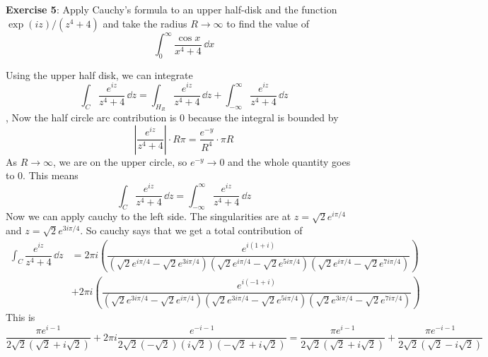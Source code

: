 \documentclass{article}
\begin{document}
\newpage

\textbf{Exercise 5}: Apply Cauchy's formula to an upper half-disk and the function $\exp(iz)/(z^{4} + 4)$ and take the radius $R \rightarrow \infty$ to find the value of 
    \begin{equation*}
        \int_{0}^{\infty} \dfrac{\cos{x}}{x^{4} + 4} \, \dd{x} 
    \end{equation*}
    \begin{answer}
        Using the upper half disk, we can integrate
            \begin{equation*}
                \int_{C}^{} \dfrac{e^{iz}}{z^{4} + 4} \, \dd{z} = \int_{H_{R}}^{} \dfrac{e^{iz}}{z^{4} + 4} \, \dd{z}  + \int_{-\infty}^{\infty} \dfrac{e^{iz}}{z^{4} + 4} \, \dd{z} 
            \end{equation*},
        Now the half circle arc contribution is $0$ because the integral is bounded by
            \begin{equation*}
                \left\lvert \dfrac{e^{iz}}{z^{4} + 4} \right\rvert \cdot R\pi = \dfrac{e^{-y}}{R^{4}} \cdot \pi R
            \end{equation*}
        As $R \rightarrow \infty$, we are on the upper circle, so $e^{-y} \rightarrow 0$ and the whole quantity goes to $0$. This means
            \begin{equation*}
                \int_{C}^{} \dfrac{e^{iz}}{z^{4} + 4} \, \dd{z}  = \int_{-\infty}^{\infty} \dfrac{e^{iz}}{z^{4} + 4} \, \dd{z} 
            \end{equation*}
        Now we can apply cauchy to the left side. The singularities are at $z = \sqrt{2}e^{i\pi / 4}$ and $z = \sqrt{2}e^{3i\pi/4}$. So cauchy says that we get a total contribution of 
            \begin{align*}
                \int_{C}^{} \dfrac{e^{iz}}{z^{4} + 4} \, \dd{z}  &= 2\pi i (\dfrac{e^{i(1 + i)}}{(\sqrt{2}e^{i\pi/4} - \sqrt{2}e^{3i\pi/4})(\sqrt{2}e^{i\pi/4} - \sqrt{2}e^{5i\pi/4})(\sqrt{2}e^{i\pi/4} - \sqrt{2}e^{7i\pi/4})}) \\
                &+ 2\pi i (\dfrac{e^{i(-1 + i)}}{(\sqrt{2}e^{3i\pi/4} - \sqrt{2}e^{i\pi/4})(\sqrt{2}e^{3i\pi/4} - \sqrt{2}e^{5i\pi/4})(\sqrt{2}e^{3i\pi/4} - \sqrt{2}e^{7i\pi/4})}) 
            \end{align*}
        This is
            \begin{equation*}
                \dfrac{\pi e^{i - 1}}{2\sqrt{2}(\sqrt{2} + i\sqrt{2})} + 2\pi i \dfrac{e^{-i - 1}}{2\sqrt{2}(-\sqrt{2})(i\sqrt{2})(-\sqrt{2} + i\sqrt{2})} = \dfrac{\pi e^{i - 1}}{2\sqrt{2}(\sqrt{2} + i\sqrt{2})} + \dfrac{\pi e^{-i - 1}}{2\sqrt{2}(\sqrt{2} - i\sqrt{2})}

\end{equation*}
\end{answer}
\end{document}
